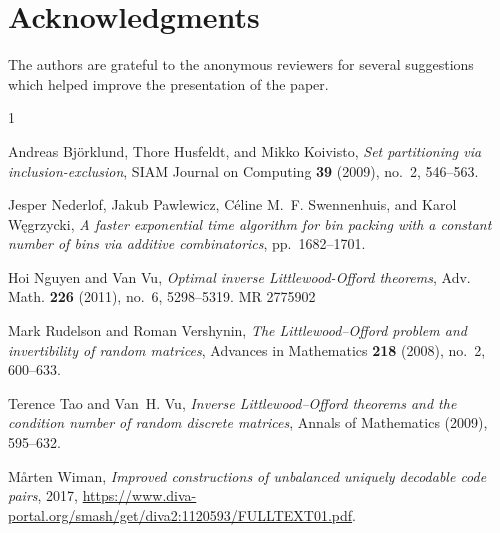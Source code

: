\documentclass[11pt]{article}
\numberwithin{equation}{section}
\theoremstyle{definition}
\theoremstyle{remark}
\begin{document}
\section*{Acknowledgments} %
The authors are grateful to the anonymous reviewers for several suggestions which helped improve the presentation of the paper.
\providecommand{\bysame}{\leavevmode\hbox to3em{\hrulefill}\thinspace}
\providecommand{\MR}{\relax\ifhmode\unskip\space\fi MR }
\providecommand{\MRhref}[2]{%
  \href{http://www.ams.org/mathscinet-getitem?mr=#1}{#2}
}
\providecommand{\href}[2]{#2}
\begin{thebibliography}{1}

Andreas Bj{\"o}rklund, Thore Husfeldt, and Mikko Koivisto, \emph{Set
  partitioning via inclusion-exclusion}, SIAM Journal on Computing \textbf{39}
  (2009), no.~2, 546--563.

Jesper Nederlof, Jakub Pawlewicz, Céline M.~F. Swennenhuis, and Karol
  Węgrzycki, \emph{A faster exponential time algorithm for bin packing with a
  constant number of bins via additive combinatorics}, pp.~1682--1701.

Hoi Nguyen and Van Vu, \emph{Optimal inverse {L}ittlewood-{O}fford theorems},
  Adv. Math. \textbf{226} (2011), no.~6, 5298--5319. \MR{2775902}

Mark Rudelson and Roman Vershynin, \emph{The {L}ittlewood--{O}fford problem and
  invertibility of random matrices}, Advances in Mathematics \textbf{218}
  (2008), no.~2, 600--633.

Terence Tao and Van~H. Vu, \emph{Inverse {L}ittlewood--{O}fford theorems and
  the condition number of random discrete matrices}, Annals of Mathematics
  (2009), 595--632.

M{\aa}rten Wiman, \emph{Improved constructions of unbalanced uniquely decodable
  code pairs}, 2017,
  \url{https://www.diva-portal.org/smash/get/diva2:1120593/FULLTEXT01.pdf}.

\end{thebibliography}
\end{document}
